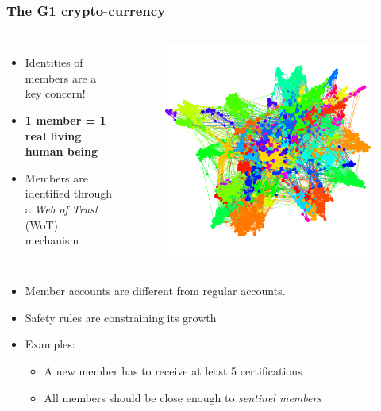 \documentclass{beamer}
\begin{document}
\begin{frame}
\frametitle{The G1 crypto-currency}

\begin{columns}[c]

\begin{itemize}
\item Identities of members are a key concern!
\item \textbf{1 member = 1 real living human being}
\item Members are identified through a \textit{Web of Trust} (WoT) mechanism
\end{itemize}
\begin{figure}
\includegraphics[width=.7\linewidth]{./figures/wot}
\end{figure}
\end{columns}

\begin{itemize}
\item Member accounts are different from regular accounts.
\item Safety rules are constraining its growth
\item Examples:
\begin{itemize}
\item A new member has to receive at least 5 certifications
\item All members should be close enough to \textit{sentinel members}
\end{itemize}
\end{itemize}


\end{frame}
\end{document}
